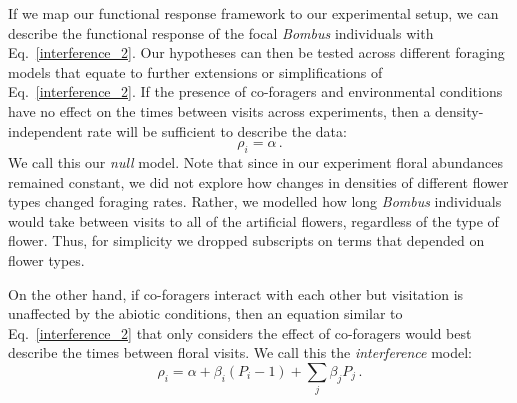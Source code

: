 \begin{refsection}
If we map our functional response framework to our experimental setup, we can describe the functional response of the focal \textit{Bombus} individuals with Eq.~\ref{interference_2}. Our hypotheses can then be tested across different foraging models that equate to further extensions or simplifications of Eq.~\ref{interference_2}. If the presence of co-foragers and environmental conditions have no effect on the times between visits across experiments, then a density-independent rate will be sufficient to describe the data:
\begin{equation}
    \rho_{i}= \alpha \,.
    \label{null}
\end{equation}
We call this our \textit{null} model. Note that since in our experiment floral abundances remained constant, we did not explore how changes in densities of different flower types changed foraging rates. Rather, we modelled how long \textit{Bombus} individuals would take between visits to all of the artificial flowers, regardless of the type of flower. Thus, for simplicity we dropped subscripts on terms that depended on flower types.

On the other hand, if co-foragers interact with each other but visitation is unaffected by the abiotic conditions, then an equation similar to Eq.~\ref{interference_2} that only considers the effect of co-foragers would best describe the times between floral visits. We call this the \textit{interference} model:
\begin{equation}
\label{interference_3}
		\rho_{i} =\alpha + \beta_{i} (P_{i}-1) + \sum_{j}\beta_{j}P_{j} \,.
\end{equation}


\end{refsection}
